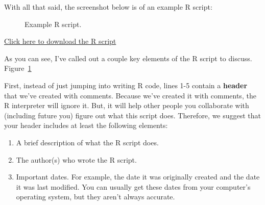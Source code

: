 \documentclass[
  letterpaper,
  DIV=11,
  numbers=noendperiod]{scrreprt}
\providecommand{\tightlist}{%
  \setlength{\itemsep}{0pt}\setlength{\parskip}{0pt}}\usepackage{longtable,booktabs,array}
\begin{document}
With all that said, the screenshot below is of an example R script:

\begin{figure}


\caption{\label{fig-example-script}Example R script.}

\end{figure}%

\href{https://www.dropbox.com/s/k0yaydzqypc9yxt/chap_7_example_script.R?dl=1}{Click
here to download the R script}

As you can see, I've called out a couple key elements of the R script to
discuss. Figure~\ref{fig-example-script}

First, instead of just jumping into writing R code, lines 1-5 contain a
\textbf{header} that we've created with comments. Because we've created
it with comments, the R interpreter will ignore it. But, it will help
other people you collaborate with (including future you) figure out what
this script does. Therefore, we suggest that your header includes at
least the following elements:

\begin{enumerate}
\def\labelenumi{\arabic{enumi}.}
\tightlist
\item
  A brief description of what the R script does.\\
\item
  The author(s) who wrote the R script.\\
\item
  Important dates. For example, the date it was originally created and
  the date it was last modified. You can usually get these dates from
  your computer's operating system, but they aren't always accurate.
\end{enumerate}
\end{document}
